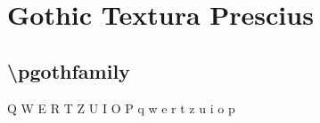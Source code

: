 \documentclass[danish,a4paper,11pt]{scrartcl}
\begin{document}
\section*{Gothic Textura Prescius}
\subsection*{\textbackslash pgothfamily}
\normalfont\pgothfamily
Q W E R T Z U I O P
\newpage
\normalfont\pgothfamily
q w e r t z u i o p
\end{document}

